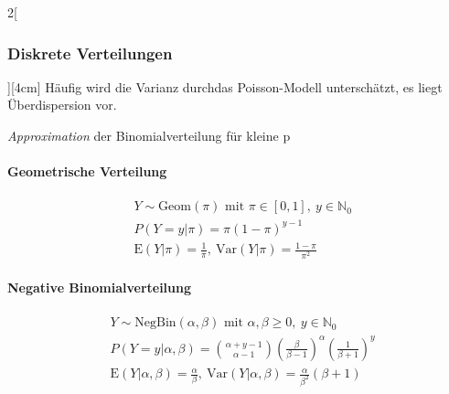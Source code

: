 \documentclass[8pt]{extarticle}
\begin{document}
\begin{multicols}{2}[\subsubsection{Diskrete Verteilungen}][4cm]
\noindent Häufig wird die Varianz durchdas Poisson-Modell unterschätzt, es liegt Überdispersion vor.
  
\noindent  \textit{Approximation} der Binomialverteilung für kleine p

  
    \paragraph{Geometrische Verteilung}

  \begin{align*}
    & Y \sim \mathrm{Geom}(\pi) \text{ mit } \pi \in \left[0,1\right] ,\: y \in \mathbb{N}_0 \\
    & P(Y=y|\pi) = \pi(1-\pi)^{y-1} \\
    & \mathrm{E}(Y|\pi) = \frac{1}{\pi} ,\: \mathrm{Var}(Y|\pi) = \frac{1-\pi}{\pi^2}
  \end{align*}
  
    \paragraph{Negative Binomialverteilung}

  \begin{align*}
    & Y \sim \mathrm{NegBin}(\alpha, \beta) \text{ mit } \alpha, \beta \geq 0 ,\: y \in \mathbb{N}_0 \\
    & P(Y=y|\alpha, \beta) = \binom{\alpha + y - 1}{\alpha - 1} \left(\frac{\beta}{\beta - 1}\right)^{\alpha} \left(\frac{1}{\beta + 1}\right)^y \\
    & \mathrm{E}(Y|\alpha,\beta) = \frac{\alpha}{\beta} ,\: \mathrm{Var}(Y|\alpha,\beta) = \frac{\alpha}{\beta^2}(\beta+1)
  \end{align*}

\end{multicols}
\end{document}
